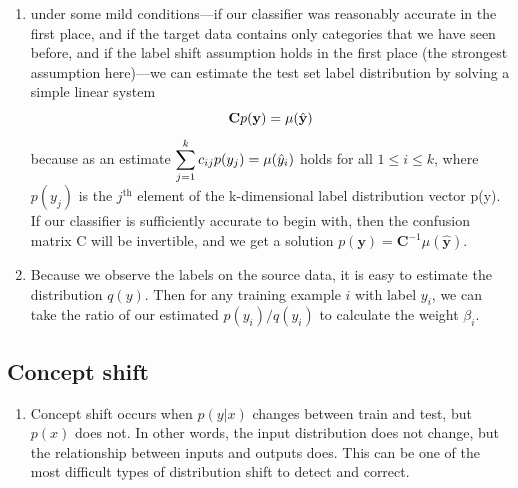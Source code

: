 \begin{enumerate}[itemsep=0.2cm]
    \item under some mild conditions—if our classifier was reasonably accurate in the first place, and if the target data contains only categories that we have seen before, and if the label shift assumption holds in the first place (the strongest assumption here)—we can estimate the test set label distribution by solving a simple linear system
    \[
        \hfill
        \mathbf{C} p(\mathbf{y}) = \mu(\hat{\mathbf{y}})
        \hfill
    \]
    because as an estimate $\displaystyle\sum_{j=1}^k c_{ij} p(y_j) = \mu(\hat{y}_i)$ holds for all $1 \leq i \leq k$, where $p(y_j)$ is the $j^\textrm{th}$ element of the k-dimensional label distribution vector p(y). If our classifier is sufficiently accurate to begin with, then the confusion matrix C will be invertible, and we get a solution $p(\mathbf{y}) = \mathbf{C}^{-1} \mu(\hat{\mathbf{y}})$.

    \item Because we observe the labels on the source data, it is easy to estimate the distribution $q(y)$. Then for any training example $i$ with label $y_i$, we can take the ratio of our estimated $p(y_i)/q(y_i)$ to calculate the weight $\beta_i$.
\end{enumerate}




\subsection{Concept shift \cite{dnn-1,mit-imbalance-outliers-shift}} \label{Concept shift}
\begin{enumerate}
    \item Concept shift occurs when $p(y|x)$ changes between train and test, but $p(x)$ does not. In other words, the input distribution does not change, but the relationship between inputs and outputs does. This can be one of the most difficult types of distribution shift to detect and correct.

    
\end{enumerate}


